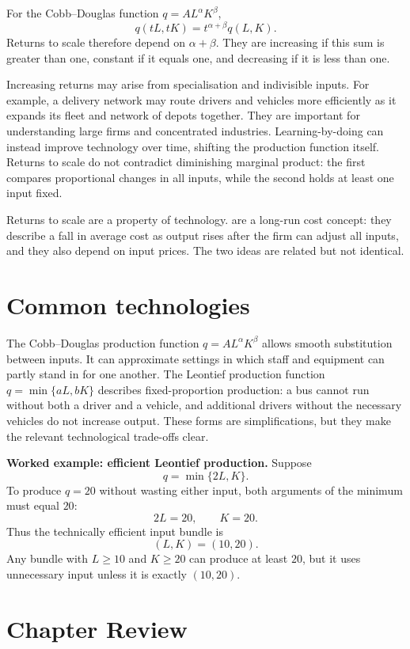For the Cobb--Douglas function $q=AL^\alpha K^\beta$,
\[
q(tL,tK)=t^{\alpha+\beta}q(L,K).
\]
Returns to scale therefore depend on $\alpha+\beta$. They are increasing if
this sum is greater than one, constant if it equals one, and decreasing if it
is less than one.

Increasing returns may arise from specialisation and indivisible inputs. For
example, a delivery network may route drivers and vehicles more efficiently as
it expands its fleet and network of depots together. They are important for
understanding large firms and concentrated industries. Learning-by-doing can
instead improve technology over time, shifting the production function itself.
Returns to scale do not contradict diminishing marginal product: the first
compares proportional changes in all inputs, while the second holds at least
one input fixed.

Returns to scale are a property of technology. 
are a long-run cost concept: they describe a fall in average cost as output
rises after the firm can adjust all inputs, and they also depend on input
prices. The two ideas are related but not identical.

\section{Common technologies}

The Cobb--Douglas production function $q=AL^\alpha K^\beta$ allows smooth
substitution between inputs. It can approximate settings in which staff and
equipment can partly stand in for one another. The Leontief production
function $q=\min\{aL,bK\}$ describes fixed-proportion production: a bus cannot
run without both a driver and a vehicle, and additional drivers without the
necessary vehicles do not increase output. These forms are simplifications,
but they make the relevant technological trade-offs clear.

\begin{keyidea}
\textbf{Worked example: efficient Leontief production.}
Suppose
\[
q=\min\{2L,K\}.
\]
To produce $q=20$ without wasting either input, both arguments of the minimum
must equal $20$:
\[
2L=20,
\qquad
K=20.
\]
Thus the technically efficient input bundle is
\[
(L,K)=(10,20).
\]
Any bundle with $L\geq10$ and $K\geq20$ can produce at least $20$, but it
uses unnecessary input unless it is exactly $(10,20)$.
\end{keyidea}

\section*{Chapter Review}

